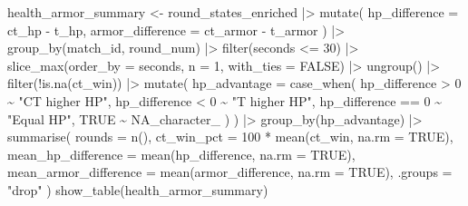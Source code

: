 \documentclass[
  letterpaper,
  DIV=11,
  numbers=noendperiod]{scrartcl}
\newenvironment{Shaded}{\begin{snugshade}}{\end{snugshade}}
\newcommand{\AttributeTok}[1]{\textcolor[rgb]{0.40,0.45,0.13}{#1}}
\newcommand{\ConstantTok}[1]{\textcolor[rgb]{0.56,0.35,0.01}{#1}}
\newcommand{\DecValTok}[1]{\textcolor[rgb]{0.68,0.00,0.00}{#1}}
\newcommand{\FunctionTok}[1]{\textcolor[rgb]{0.28,0.35,0.67}{#1}}
\newcommand{\NormalTok}[1]{\textcolor[rgb]{0.00,0.23,0.31}{#1}}
\newcommand{\OtherTok}[1]{\textcolor[rgb]{0.00,0.23,0.31}{#1}}
\newcommand{\SpecialCharTok}[1]{\textcolor[rgb]{0.37,0.37,0.37}{#1}}
\newcommand{\StringTok}[1]{\textcolor[rgb]{0.13,0.47,0.30}{#1}}
\begin{document}
\begin{Shaded}
\begin{Highlighting}[]
\NormalTok{health\_armor\_summary }\OtherTok{\textless{}{-}}\NormalTok{ round\_states\_enriched }\SpecialCharTok{|\textgreater{}}
  \FunctionTok{mutate}\NormalTok{(}
    \AttributeTok{hp\_difference =}\NormalTok{ ct\_hp }\SpecialCharTok{{-}}\NormalTok{ t\_hp,}
    \AttributeTok{armor\_difference =}\NormalTok{ ct\_armor }\SpecialCharTok{{-}}\NormalTok{ t\_armor}
\NormalTok{  ) }\SpecialCharTok{|\textgreater{}}
  \FunctionTok{group\_by}\NormalTok{(match\_id, round\_num) }\SpecialCharTok{|\textgreater{}}
  \FunctionTok{filter}\NormalTok{(seconds }\SpecialCharTok{\textless{}=} \DecValTok{30}\NormalTok{) }\SpecialCharTok{|\textgreater{}}
  \FunctionTok{slice\_max}\NormalTok{(}\AttributeTok{order\_by =}\NormalTok{ seconds, }\AttributeTok{n =} \DecValTok{1}\NormalTok{, }\AttributeTok{with\_ties =} \ConstantTok{FALSE}\NormalTok{) }\SpecialCharTok{|\textgreater{}}
  \FunctionTok{ungroup}\NormalTok{() }\SpecialCharTok{|\textgreater{}}
  \FunctionTok{filter}\NormalTok{(}\SpecialCharTok{!}\FunctionTok{is.na}\NormalTok{(ct\_win)) }\SpecialCharTok{|\textgreater{}}
  \FunctionTok{mutate}\NormalTok{(}
    \AttributeTok{hp\_advantage =} \FunctionTok{case\_when}\NormalTok{(}
\NormalTok{      hp\_difference }\SpecialCharTok{\textgreater{}} \DecValTok{0} \SpecialCharTok{\textasciitilde{}} \StringTok{"CT higher HP"}\NormalTok{,}
\NormalTok{      hp\_difference }\SpecialCharTok{\textless{}} \DecValTok{0} \SpecialCharTok{\textasciitilde{}} \StringTok{"T higher HP"}\NormalTok{,}
\NormalTok{      hp\_difference }\SpecialCharTok{==} \DecValTok{0} \SpecialCharTok{\textasciitilde{}} \StringTok{"Equal HP"}\NormalTok{,}
      \ConstantTok{TRUE} \SpecialCharTok{\textasciitilde{}} \ConstantTok{NA\_character\_}
\NormalTok{    )}
\NormalTok{  ) }\SpecialCharTok{|\textgreater{}}
  \FunctionTok{group\_by}\NormalTok{(hp\_advantage) }\SpecialCharTok{|\textgreater{}}
  \FunctionTok{summarise}\NormalTok{(}
    \AttributeTok{rounds =} \FunctionTok{n}\NormalTok{(),}
    \AttributeTok{ct\_win\_pct =} \DecValTok{100} \SpecialCharTok{*} \FunctionTok{mean}\NormalTok{(ct\_win, }\AttributeTok{na.rm =} \ConstantTok{TRUE}\NormalTok{),}
    \AttributeTok{mean\_hp\_difference =} \FunctionTok{mean}\NormalTok{(hp\_difference, }\AttributeTok{na.rm =} \ConstantTok{TRUE}\NormalTok{),}
    \AttributeTok{mean\_armor\_difference =} \FunctionTok{mean}\NormalTok{(armor\_difference, }\AttributeTok{na.rm =} \ConstantTok{TRUE}\NormalTok{),}
    \AttributeTok{.groups =} \StringTok{"drop"}
\NormalTok{  )}
\FunctionTok{show\_table}\NormalTok{(health\_armor\_summary)}
\end{Highlighting}
\end{Shaded}
\end{document}
